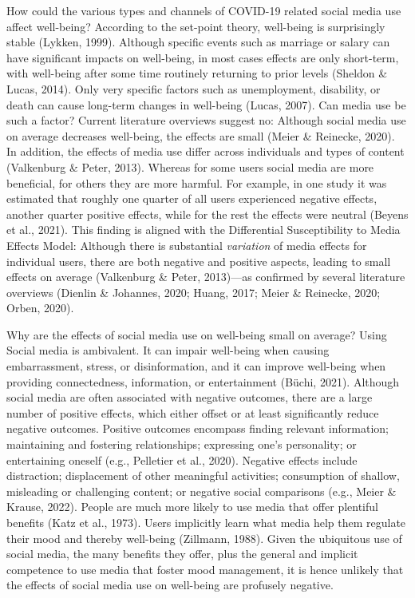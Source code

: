 \documentclass[
  man,mask,floatsintext]{apa7}
\begin{document}
How could the various types and channels of COVID-19 related social media use affect well-being?
According to the set-point theory, well-being is surprisingly stable (Lykken, 1999).
Although specific events such as marriage or salary can have significant impacts on well-being, in most cases effects are only short-term, with well-being after some time routinely returning to prior levels (Sheldon \& Lucas, 2014).
Only very specific factors such as unemployment, disability, or death can cause long-term changes in well-being (Lucas, 2007).
Can media use be such a factor?
Current literature overviews suggest no:
Although social media use on average decreases well-being, the effects are small (Meier \& Reinecke, 2020).
In addition, the effects of media use differ across individuals and types of content (Valkenburg \& Peter, 2013).
Whereas for some users social media are more beneficial, for others they are more harmful.
For example, in one study it was estimated that roughly one quarter of all users experienced negative effects, another quarter positive effects, while for the rest the effects were neutral (Beyens et al., 2021).
This finding is aligned with the Differential Susceptibility to Media Effects Model:
Although there is substantial \emph{variation} of media effects for individual users, there are both negative and positive aspects, leading to small effects on average (Valkenburg \& Peter, 2013)---as confirmed by several literature overviews (Dienlin \& Johannes, 2020; Huang, 2017; Meier \& Reinecke, 2020; Orben, 2020).

Why are the effects of social media use on well-being small on average?
Using Social media is ambivalent.
It can impair well-being when causing embarrassment, stress, or disinformation, and it can improve well-being when providing connectedness, information, or entertainment (Büchi, 2021).
Although social media are often associated with negative outcomes, there are a large number of positive effects, which either offset or at least significantly reduce negative outcomes.
Positive outcomes encompass finding relevant information; maintaining and fostering relationships; expressing one's personality; or entertaining oneself (e.g., Pelletier et al., 2020).
Negative effects include distraction; displacement of other meaningful activities; consumption of shallow, misleading or challenging content; or negative social comparisons (e.g., Meier \& Krause, 2022).
People are much more likely to use media that offer plentiful benefits (Katz et al., 1973).
Users implicitly learn what media help them regulate their mood and thereby well-being (Zillmann, 1988).
Given the ubiquitous use of social media, the many benefits they offer, plus the general and implicit competence to use media that foster mood management, it is hence unlikely that the effects of social media use on well-being are profusely negative.
\end{document}
